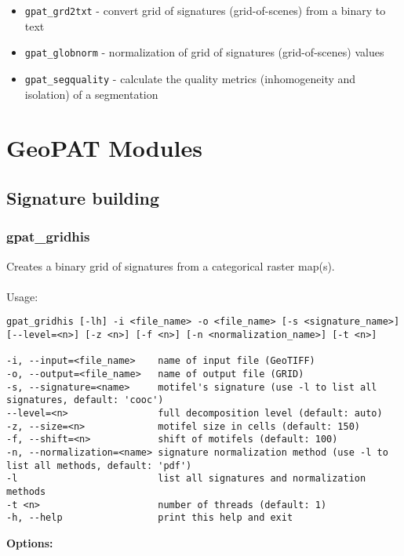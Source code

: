 \begin{itemize}
  \item \texttt{gpat\_grd2txt} - convert grid of signatures (grid-of-scenes) from a binary to text
  \item \texttt{gpat\_globnorm} - normalization of grid of signatures (grid-of-scenes) values
  \item \texttt{gpat\_segquality} - calculate the quality metrics (inhomogeneity and isolation) of a segmentation
\end{itemize}

\section{GeoPAT Modules}

\subsection{Signature building}

\subsubsection{gpat\_gridhis}
Creates a binary grid of signatures from a categorical raster map(s).
\\\\
Usage:

\begin{minipage}{\linewidth}
\begin{lstlisting}
gpat_gridhis [-lh] -i <file_name> -o <file_name> [-s <signature_name>] [--level=<n>] [-z <n>] [-f <n>] [-n <normalization_name>] [-t <n>]

-i, --input=<file_name>    name of input file (GeoTIFF)
-o, --output=<file_name>   name of output file (GRID)
-s, --signature=<name>     motifel's signature (use -l to list all signatures, default: 'cooc')
--level=<n>                full decomposition level (default: auto)
-z, --size=<n>             motifel size in cells (default: 150)
-f, --shift=<n>            shift of motifels (default: 100)
-n, --normalization=<name> signature normalization method (use -l to list all methods, default: 'pdf')
-l                         list all signatures and normalization methods
-t <n>                     number of threads (default: 1)
-h, --help                 print this help and exit
\end{lstlisting}
\end{minipage}

{\bf Options:}

